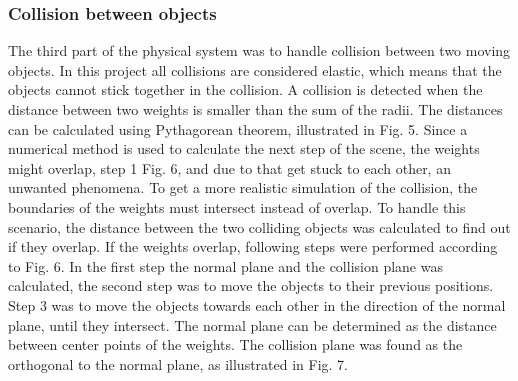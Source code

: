 \documentclass[a4paper,12pt,twoside,english]{article}
\begin{document}
\subsubsection{Collision between objects}
The third part of the physical system was to handle collision between two moving objects. In this project all collisions are considered elastic, which means that the objects cannot stick together in the collision.
A collision is detected when the distance between two weights is smaller than the sum of the radii. The distances can be calculated using Pythagorean theorem, illustrated in Fig. 5. 
Since a numerical method is used to calculate the next step of the scene, the weights might overlap, step 1 Fig. 6, and due to that get stuck to each other, an unwanted phenomena. To get a more realistic simulation of the collision, the boundaries of the weights must intersect instead of overlap. To handle this scenario, the  distance between the two colliding objects was calculated to find out if they overlap. If the weights overlap, following steps were performed according to Fig. 6. In the first step the normal plane and the collision plane was calculated, the second step was to move the objects to their previous positions. Step 3 was to move the objects towards each other in the direction of the normal plane, until they intersect. The normal plane can be determined as the distance between center points of the weights. The collision plane was found as the orthogonal to the normal plane, as illustrated in Fig. 7. 
\end{document}
